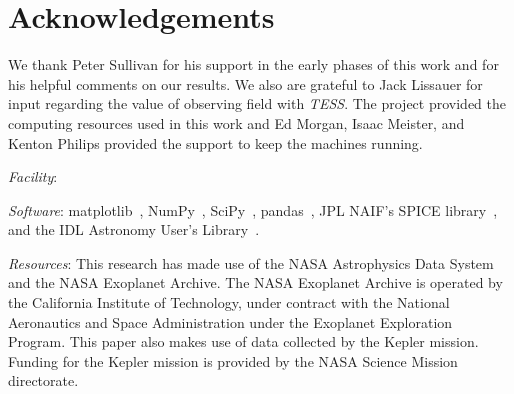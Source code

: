 \section*{Acknowledgements}
We thank Peter Sullivan for his support in the early phases of this work and for his helpful comments on our results.
We also are grateful to Jack Lissauer for input regarding the value of observing \keplers field with \textit{TESS}.
The \tess project provided the computing resources used in this work and Ed Morgan, Isaac Meister, and Kenton Philips provided the support to keep the machines running.

\vspace{0.5cm}
\textit{Facility}: \tess

\textit{Software}: matplotlib~\citep{hunter_matplotlib_2007}, NumPy~\citep{walt_numpy_2011}, SciPy~\citep{jones_scipy_2001}, pandas~\citep{mckinneypandas}, JPL NAIF's SPICE library~\citep{acton_SPICE_1996}, and the IDL Astronomy User's Library~\citep{landsman_idl_1995}.

\textit{Resources}: This research has made use of the NASA Astrophysics Data System and the NASA Exoplanet Archive. The NASA Exoplanet Archive is operated by the California Institute of Technology, under contract with the National Aeronautics and Space Administration under the Exoplanet Exploration Program.
This paper also makes use of data collected by the Kepler mission. Funding for the Kepler mission is provided by the NASA Science Mission directorate.
